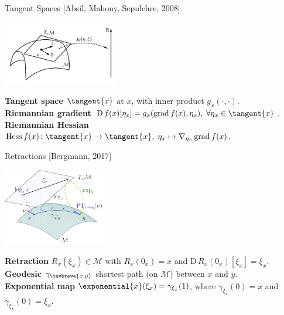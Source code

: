 \documentclass[9pt]{beamer}
\begin{document}
\begin{frame}{Tangent Spaces}
    \vspace{-1\baselineskip}\hfill{\tiny{[Absil, Mahony, Sepulchre, 2008]}}
    \begin{center}
        \includegraphics[width=5cm]{img/Riemannian_Metric.png}
    \end{center}
    \textbf{Tangent space} $\tangent{x}$ at $x$, with inner product $g_x(\cdot, \cdot)$. \\[0.2\baselineskip]
    \textbf{Riemannian gradient} $\mathrm{D} \, f(x) [\eta_x] = g_x (\operatorname{grad} f(x), \eta_x), \; \forall \eta_x \in \tangent{x}$. \\[0.2\baselineskip]
    \textbf{Riemannian Hessian} $\operatorname{Hess} f(x) \colon \tangent{x} \to \tangent{x}, \; \eta_x \mapsto \nabla_{\eta_x} \operatorname{grad} f(x)$.
\end{frame}

\begin{frame}{Retractions}
    \vspace{-1\baselineskip}\hfill{\tiny{[Bergmann, 2017]}}
    \begin{center}
        \includegraphics[width=4.5cm]{img/manifold-terms.png}
    \end{center}
    \textbf{Retraction} $R_{x}(\xi_x) \in \mathcal{M}$ with $R_x (0_x) = x$ and $\mathrm{D} \, R_x (0_x)[\xi_x] = \xi_x$.
    \textbf{Geodesic} $\gamma_{\invbreve{x,y}}$ shortest path (on $\mathcal{M}$) between $x$ and $y$. \\[0.2\baselineskip]
    \textbf{Exponential map} $\exponential{x}(\xi_x) = \gamma_{\xi_x}(1)$, where $\gamma_{\xi_x}(0) = x$ and $\dot{\gamma}_{\xi_x}(0) = \xi_x$. \\[0.2\baselineskip]
\end{frame}
\end{document}
